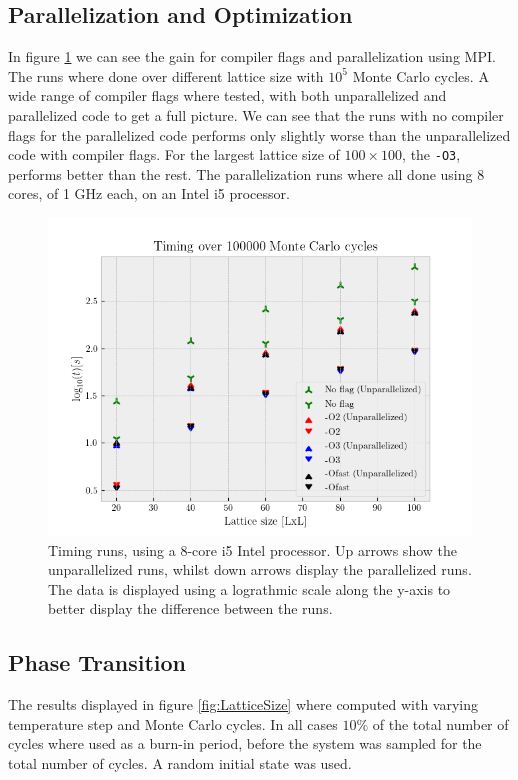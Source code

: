 \documentclass[%
reprint,
nofootinbib,
amsmath,amssymb,
aps,
]{revtex4-1}
\begin{document}
\subsection{Parallelization and Optimization} %
In figure \ref{fig:TimingRuns} we can see the gain for compiler flags and parallelization using MPI. The runs where done over different lattice size with $10^5$ Monte Carlo cycles. A wide range of compiler flags where tested, with both unparallelized and parallelized code to get a full picture. We can see that the runs with no compiler flags for the parallelized code performs only slightly worse than the unparallelized code with compiler flags. 
For the largest lattice size of $100\times 100$, the \texttt{-O3}, performs better than the rest. The parallelization runs where all done using 8 cores, of 1 GHz each, on an Intel i5 processor. 
\begin{figure}
	\centering
	\includegraphics[width=0.95\linewidth]{./figures/TimingRuns.png}
	\caption{Timing runs, using a 8-core i5 Intel processor. Up arrows show the unparallelized runs, whilst down arrows display the parallelized runs. The data is displayed using a lograthmic scale along the y-axis to better display the difference between the runs.}
	\label{fig:TimingRuns}
\end{figure}
\subsection{Phase Transition} %
The results displayed in figure \ref{fig:LatticeSize} where computed with varying temperature step and Monte Carlo cycles. In all cases $10\%$ of the total number of cycles where used as a burn-in period, before the system was sampled for the total number of cycles. A random initial state was used. 
\end{document}

